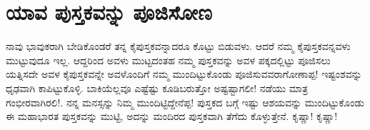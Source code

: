\section*{ಯಾವ ಪುಸ್ತಕವನ್ನು ಪೂಜಿಸೋಣ}

ನಾವು ಭಾವುಕರಾಗಿ ಬೇಡಿಕೊಂಡರೆ ತನ್ನ ಕೈಪುಸ್ತಕವನ್ನಾದರೂ ಕೊಟ್ಟು ಬಿಡುವಳು. ಆದರೆ ನಮ್ಮ ಕೈಪುಸ್ತಕವನ್ನವಳು ಮುಟ್ಟುವುದೂ ಇಲ್ಲ. ಆದ್ದರಿಂದ ಅವಳು ಮುಟ್ಟದಂತಹ ನಮ್ಮ ಪುಸ್ತಕವನ್ನು ಅವಳ ಪಕ್ಕದಲ್ಲಿಟ್ಟು ಪೂಜಿಸಲು ಯತ್ನಿಸದೇ ಅವಳ ಕೈಪುಸ್ತಕವನ್ನೇ ಅವಳೊಂದಿಗೆ ನಮ್ಮ ಮುಂದಿಟ್ಟುಕೊಂಡು ಪೂಜಿಸುವವರಾಗೋಣಾಪ್ಪ! ಇಷ್ಟಂಶವನ್ನು ಧೃಢವಾಗಿ ಕಾಪಿಟ್ಟುಕೊಳ್ಳಿ. ಬಾಕಿಯೆಲ್ಲವೂ ಎಷ್ಟೆಷ್ಟು ಕೂಡಿಬರುತ್ತೋ ಅಷ್ಟಷ್ಟಾಗಲೀ! ನಡೆಯು ಮಾತ್ರ ಗಂಭೀರವಾಗಿರಲಿ!. ನನ್ನ ಮನಸ್ಸನ್ನು ನಿಮ್ಮ ಮುಂದಿಟ್ಟಿದ್ದೇನೆಪ್ಪ! ಪುಸ್ತಕದ ಬಗ್ಗೆ ಇಷ್ಟು ಆಶಯವನ್ನು ಮುಂದಿಟ್ಟುಕೊಂಡು ಈ ಮಹಾಭಾರತ ಪುಸ್ತಕವನ್ನು ಮುಟ್ಟಿ, ಅದನ್ನು ಮಂದಿರದ ಪುಸ್ತಕವಾಗಿ ತೆಗೆದು ಕೊಳ್ಳುತ್ತೇನೆ. ಕೃಷ್ಣಾ! ಕೃಷ್ಣಾ!



